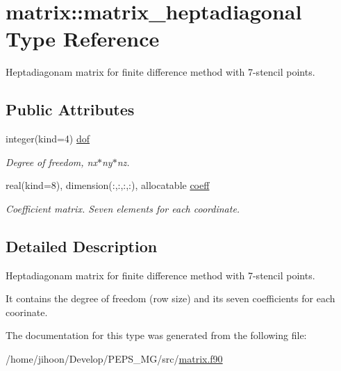 \hypertarget{structmatrix_1_1matrix__heptadiagonal}{}\section{matrix\+:\+:matrix\+\_\+heptadiagonal Type Reference}
\label{structmatrix_1_1matrix__heptadiagonal}


Heptadiagonam matrix for finite difference method with 7-\/stencil points.  


\subsection*{Public Attributes}
\begin{DoxyCompactItemize}
\item 
\mbox{\label{structmatrix_1_1matrix__heptadiagonal_a8e4e9d79c193e6f1c84ca92bcdec20d5}} 
integer(kind=4) \hyperlink{structmatrix_1_1matrix__heptadiagonal_a8e4e9d79c193e6f1c84ca92bcdec20d5}{dof}
\begin{DoxyCompactList}\small\item\em Degree of freedom, nx$\ast$ny$\ast$nz. \end{DoxyCompactList}\item 
\mbox{\label{structmatrix_1_1matrix__heptadiagonal_a9c13c717e99078c79ac99dec1b563a6d}} 
real(kind=8), dimension(\+:,\+:,\+:,\+:), allocatable \hyperlink{structmatrix_1_1matrix__heptadiagonal_a9c13c717e99078c79ac99dec1b563a6d}{coeff}
\begin{DoxyCompactList}\small\item\em Coefficient matrix. Seven elements for each coordinate. \end{DoxyCompactList}\end{DoxyCompactItemize}


\subsection{Detailed Description}
Heptadiagonam matrix for finite difference method with 7-\/stencil points. 

It contains the degree of freedom (row size) and its seven coefficients for each coorinate. 

The documentation for this type was generated from the following file\+:\begin{DoxyCompactItemize}
\item 
/home/jihoon/\+Develop/\+P\+E\+P\+S\+\_\+\+M\+G/src/\hyperlink{matrix_8f90}{matrix.\+f90}\end{DoxyCompactItemize}
